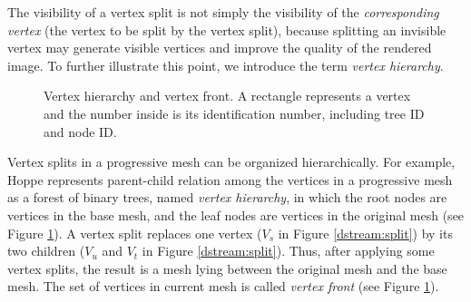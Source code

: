     The visibility of a vertex split is not simply the visibility of the \emph{corresponding
    vertex} (the vertex to be split by the vertex split), because splitting an invisible
    vertex may generate visible vertices and improve the quality of the rendered image. 
    To further illustrate this point, we introduce the term \emph{vertex hierarchy}.
    \begin{figure}
    \centering
    \caption{Vertex hierarchy and vertex front. A rectangle represents a vertex and the number inside
    is its identification number, including tree ID and node ID.\label{dstream:hierarchy}}
    \end{figure}
    Vertex splits in a progressive mesh can be organized hierarchically.
    For example, Hoppe \cite{258843} represents
    parent-child relation among the vertices in a progressive mesh
    as a forest of binary trees, named \emph{vertex hierarchy},
    in which the root nodes are vertices in the base mesh, and
    the leaf nodes are vertices in the original mesh (see Figure \ref{dstream:hierarchy}).
    A vertex split replaces one vertex ($V_s$ in Figure \ref{dstream:split})
    by its two children ($V_u$ and $V_t$ in Figure \ref{dstream:split}).
    Thus, after applying some vertex splits,
    the result is a mesh lying between the original mesh and the base mesh.
    The set of vertices in current mesh is called \emph{vertex front}
    \cite{258843}
    (see Figure \ref{dstream:hierarchy}).%
    
